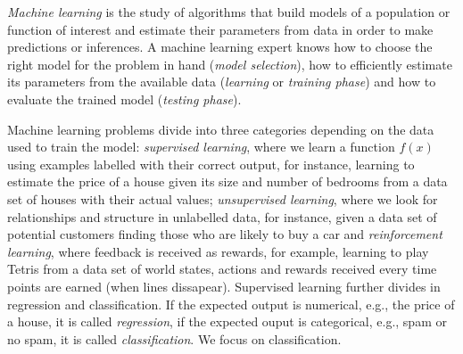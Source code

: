 \emph{Machine learning} is the study of algorithms that build models of a population or function of interest and estimate their parameters from data in order to make predictions or inferences. A machine learning expert knows how to choose the right model for the problem in hand (\emph{model selection}), how to efficiently estimate its parameters from the available data (\emph{learning} or \emph{training phase}) and how to evaluate the trained model (\emph{testing phase}).

Machine learning problems divide into three categories depending on the data used to train the model: \emph{supervised learning}, where we learn a function $f(x)$ using examples labelled with their correct output, for instance, learning to estimate the price of a house given its size and number of bedrooms from a data set of houses with their actual values; \emph{unsupervised learning}, where we look for relationships and structure in unlabelled data, for instance, given a data set of potential customers finding those who are likely to buy a car and \emph{reinforcement learning}, where feedback is received as rewards, for example, learning to play Tetris from a data set of world states, actions and rewards received every time points are earned (when lines dissapear). Supervised learning further divides in regression and classification. If the expected output is numerical, e.g., the price of a house, it is called \emph{regression}, if the expected ouput is categorical, e.g., spam or no spam, it is called \emph{classification}. We focus on classification.


